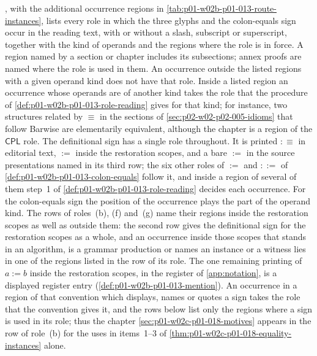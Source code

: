, with the additional occurrence regions
in \cref{tab:p01-w02b-p01-013-route-instances}, lists every role in which the three
glyphs and the colon-equals sign occur in the reading text, with or without
a slash, subscript or superscript, together with the kind of operands and the regions where the
role is in force.  A region named by a section or chapter includes its
subsections; annex proofs are named where the role is used in them.  An
occurrence outside the listed regions with a given operand kind does not
have that role.  Inside a listed region an occurrence whose operands are of
another kind takes the role that the procedure of
\cref{def:p01-w02b-p01-013-role-reading} gives for that kind; for
instance, two structures related by \(\equiv\) in the sections of
\cref{sec:p02-w02-p02-005-idioms} that follow Barwise are elementarily
equivalent, although the chapter is a region of the \(\mathsf{CPL}\) role.
The definitional sign has a single role throughout.  It is printed
\(\mathrel{:\equiv}\) in editorial text, \(\mathrel{:=}\) inside the
restoration scopes, and a bare \(:=\) in the source presentations named in
its third row; the six other roles of \(:=\) and \(::=\) of
\cref{def:p01-w02b-p01-013-colon-equals} follow it, and inside a region of
several of them step~1 of \cref{def:p01-w02b-p01-013-role-reading} decides
each occurrence.  For the colon-equals sign the position of the occurrence
plays the part of the operand kind.  The rows of roles~(b), (f) and~(g)
name their regions inside the restoration scopes as well as outside them:
the second row gives the definitional sign for the restoration scopes as a
whole, and an occurrence inside those scopes that stands in an algorithm,
is a grammar production or names an instance or a witness lies in one of
the regions listed in the row of its role.  The one remaining printing of
\(a\mathrel{:=}b\) inside the restoration scopes, in the register of
\cref{app:notation}, is a displayed register entry
(\cref{def:p01-w02b-p01-013-mention}).  An occurrence in a region of that
convention which displays, names or quotes a sign takes the role that the
convention gives it, and the rows below list only the regions where a sign
is used in its role; thus the chapter \cref{sec:p01-w02c-p01-018-motives}
appears in the row of role~(b) for the uses in items~1--3 of
\cref{thm:p01-w02c-p01-018-equality-instances} alone.


